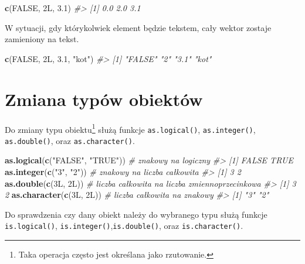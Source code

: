\documentclass[paper=6in:9in,pagesize=pdftex,headinclude=on,footinclude=on,10pt]{scrbook}
\newenvironment{Shaded}{\begin{snugshade}}{\end{snugshade}}
\newcommand{\CommentTok}[1]{\textcolor[rgb]{0.56,0.35,0.01}{\textit{#1}}}
\newcommand{\FloatTok}[1]{\textcolor[rgb]{0.00,0.00,0.81}{#1}}
\newcommand{\KeywordTok}[1]{\textcolor[rgb]{0.13,0.29,0.53}{\textbf{#1}}}
\newcommand{\NormalTok}[1]{#1}
\newcommand{\OtherTok}[1]{\textcolor[rgb]{0.56,0.35,0.01}{#1}}
\newcommand{\StringTok}[1]{\textcolor[rgb]{0.31,0.60,0.02}{#1}}
\begin{document}
\begin{Shaded}
\begin{Highlighting}[]
\KeywordTok{c}\NormalTok{(}\OtherTok{FALSE}\NormalTok{, 2L, }\FloatTok{3.1}\NormalTok{)}
\CommentTok{#> [1] 0.0 2.0 3.1}
\end{Highlighting}
\end{Shaded}

W sytuacji, gdy którykolwiek element będzie tekstem, cały wektor zostaje zamieniony na tekst.

\begin{Shaded}
\begin{Highlighting}[]
\KeywordTok{c}\NormalTok{(}\OtherTok{FALSE}\NormalTok{, 2L, }\FloatTok{3.1}\NormalTok{, }\StringTok{"kot"}\NormalTok{)}
\CommentTok{#> [1] "FALSE" "2"     "3.1"   "kot"}
\end{Highlighting}
\end{Shaded}

\hypertarget{zmiana-typuxf3w-obiektuxf3w}{%
\section{Zmiana typów obiektów}\label{zmiana-typuxf3w-obiektuxf3w}}

Do zmiany typu obiektu\footnote{Taka operacja często jest określana jako rzutowanie.} służą funkcje \texttt{as.logical()}, \texttt{as.integer()}, \texttt{as.double()}, oraz \texttt{as.character()}.

\begin{Shaded}
\begin{Highlighting}[]
\KeywordTok{as.logical}\NormalTok{(}\KeywordTok{c}\NormalTok{(}\StringTok{"FALSE"}\NormalTok{, }\StringTok{"TRUE"}\NormalTok{)) }\CommentTok{# znakowy na logiczny}
\CommentTok{#> [1] FALSE  TRUE}
\KeywordTok{as.integer}\NormalTok{(}\KeywordTok{c}\NormalTok{(}\StringTok{"3"}\NormalTok{, }\StringTok{"2"}\NormalTok{)) }\CommentTok{# znakowy na liczba całkowita }
\CommentTok{#> [1] 3 2}
\KeywordTok{as.double}\NormalTok{(}\KeywordTok{c}\NormalTok{(3L, 2L)) }\CommentTok{# liczba całkowita na liczba zmiennoprzecinkowa}
\CommentTok{#> [1] 3 2}
\KeywordTok{as.character}\NormalTok{(}\KeywordTok{c}\NormalTok{(3L, 2L)) }\CommentTok{# liczba całkowita na znakowy}
\CommentTok{#> [1] "3" "2"}
\end{Highlighting}
\end{Shaded}

Do sprawdzenia czy dany obiekt należy do wybranego typu służą funkcje \texttt{is.logical()}, \texttt{is.integer()},\texttt{is.double()}, oraz \texttt{is.character()}.
\end{document}
